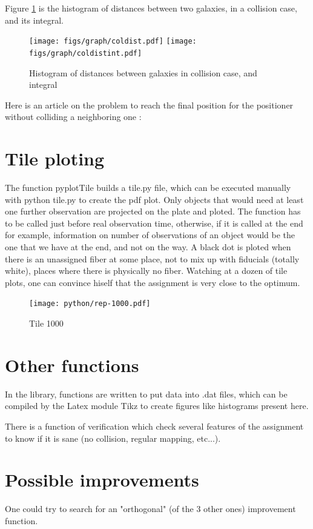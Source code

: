 \documentclass{article}
\begin{document}
Figure \ref{coldist} is the histogram of distances between two galaxies, in a collision case, and its integral.

\begin{figure}[H]\begin{center}
	\texttt{[image: figs/graph/coldist.pdf]}
	\texttt{[image: figs/graph/coldistint.pdf]}
	\caption{Histogram of distances between galaxies in collision case, and integral}\label{coldist}
\end{center}\end{figure}

Here is an article on the problem to reach the final position for the positioner without colliding a neighboring one : \cite{collision}

\section{Tile ploting}
The function pyplotTile builds a tile.py file, which can be executed manually with python tile.py to create the pdf plot.
Only objects that would need at least one further observation are projected on the plate and ploted. The function has to be called just before real observation time, otherwise, if it is called at the end for example, information on number of observations of an object would be the one that we have at the end, and not on the way.
A black dot is ploted when there is an unassigned fiber at some place, not to mix up with fiducials (totally white), places where there is physically no fiber.
Watching at a dozen of tile plots, one can convince hiself that the assignment is very close to the optimum.

\begin{figure}[H]
\hspace*{-1.5cm}
    \texttt{[image: python/rep-1000.pdf]}
	\caption{Tile 1000}
\end{figure}

\section{Other functions}
In the library, functions are written to put data into .dat files, which can be compiled by the Latex module Tikz to create figures like histograms present here.

There is a function of verification which check several features of the assignment to know if it is sane (no collision, regular mapping, etc...).

\section{Possible improvements}
One could try to search for an "orthogonal" (of the 3 other ones) improvement function.
\end{document}
